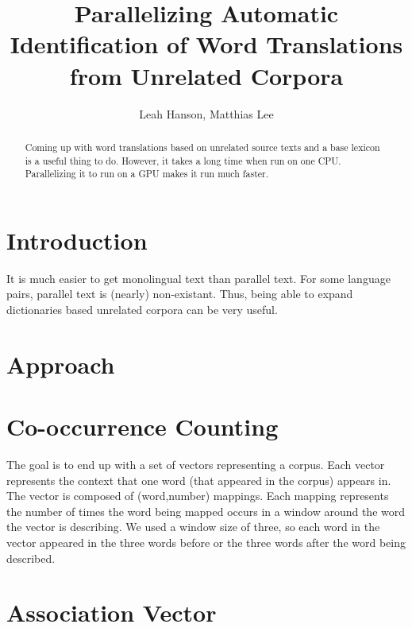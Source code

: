 \documentclass[12pt]{article}
\title{Parallelizing Automatic Identification of Word Translations from Unrelated Corpora}
\author{Leah Hanson, Matthias Lee}
\begin{document}
\maketitle
\begin{abstract}

Coming up with word translations based on unrelated source texts and a base
lexicon is a useful thing to do. However, it takes a long time when run on one
CPU. Parallelizing it to run on a GPU makes it run much faster.

\end{abstract}
\section{Introduction}

It is much easier to get monolingual text than parallel text. For some
language pairs, parallel text is (nearly) non-existant. Thus, being able to
expand dictionaries based unrelated corpora can be very useful.


\section{Approach}

\section{Co-occurrence Counting}

The goal is to end up with a set of vectors representing a
corpus. Each vector represents the context that one word (that appeared in the
corpus) appears in. The vector is composed of (word,number) mappings. Each
mapping represents the number of times the word being mapped occurs in a
window around the word the vector is describing. We used a window size of
three, so each word in the vector appeared in the three words before or the
three words after the word being described.

\section{Association Vector}
\end{document}
